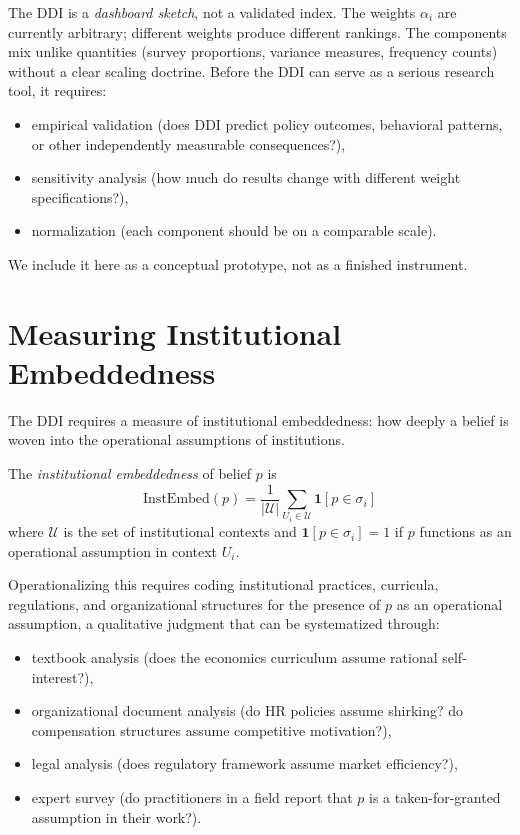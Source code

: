 \begin{remark}
\label{rem:ddi-limitations}
The DDI is a \emph{dashboard sketch}, not a validated index.
The weights $\alpha_i$ are currently arbitrary; different weights produce different rankings.
The components mix unlike quantities (survey proportions, variance measures, frequency counts) without a clear scaling doctrine.
Before the DDI can serve as a serious research tool, it requires:
\begin{itemize}[nosep]
  \item empirical validation (does DDI predict policy outcomes, behavioral patterns, or other independently measurable consequences?),
  \item sensitivity analysis (how much do results change with different weight specifications?),
  \item normalization (each component should be on a comparable scale).
\end{itemize}
We include it here as a conceptual prototype, not as a finished instrument.
\end{remark}


\section{Measuring Institutional Embeddedness}
\label{sec:ch13-embeddedness}

The DDI requires a measure of institutional embeddedness: how deeply a belief is woven into the operational assumptions of institutions.

\begin{definition}
\label{def:inst-embed}
The \emph{institutional embeddedness} of belief $p$ is
\[
  \mathrm{InstEmbed}(p) = \frac{1}{|\mathcal{U}|} \sum_{U_i \in \mathcal{U}} \mathbf{1}[p \in \sigma_i]
\]
where $\mathcal{U}$ is the set of institutional contexts and $\mathbf{1}[p \in \sigma_i] = 1$ if $p$ functions as an operational assumption in context $U_i$.
\end{definition}

Operationalizing this requires coding institutional practices, curricula, regulations, and organizational structures for the presence of $p$ as an operational assumption, a qualitative judgment that can be systematized through:
\begin{itemize}[nosep]
  \item textbook analysis (does the economics curriculum assume rational self-interest?),
  \item organizational document analysis (do HR policies assume shirking? do compensation structures assume competitive motivation?),
  \item legal analysis (does regulatory framework assume market efficiency?),
  \item expert survey (do practitioners in a field report that $p$ is a taken-for-granted assumption in their work?).
\end{itemize}

